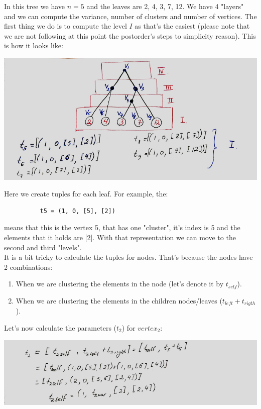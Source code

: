 \documentclass[11pt,a4paper,english]{article}
\begin{document}
        In this tree we have $n=5$ and the leaves are 2, 4, 3, 7, 12. We have 4 "layers" and we can compute the variance, number of clusters and number of vertices. The first thing we do is to compute the level $I$ as that's the easiest (please note that we are not following at this point the postorder's steps to simplicity reason). This is how it looks like:
        \begin{center}
          \includegraphics[width=15cm]{sc_1.png}
        \end{center}
        Here we create tuples for each leaf. For example, the:
        \begin{verbatim}
          t5 = (1, 0, [5], [2])
        \end{verbatim}

        means that this is the vertex 5, that has one "cluster", it's index is 5 and the elements that it holds are [2]. With that representation we can move to the second and third "levels". \\
        It is a bit tricky to calculate the tuples for nodes. That's because the nodes have 2 combinations:
        \begin{enumerate}
          \item When we are clustering the elements in the node (let's denote it by $t_{self}$).
          \item When we are clustering the elements in the children nodes/leaves ($t_{left} + t_{rigth}$).
        \end{enumerate}

        Let's now calculate the parameters ($t_2$) for $vertex_2$:
        \begin{center}
          \includegraphics[width=15cm]{sc_2.png}
        \end{center}
\end{document}
